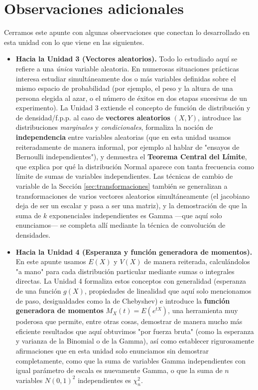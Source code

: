 \documentclass[11pt,a4paper]{article}
\theoremstyle{plain}
\theoremstyle{definition}
\theoremstyle{remark}
\begin{document}
\section{Observaciones adicionales}

Cerramos este apunte con algunas observaciones que conectan lo desarrollado en esta unidad con lo que viene en las siguientes.

\begin{itemize}
\item \textbf{Hacia la Unidad 3 (Vectores aleatorios).} Todo lo estudiado aquí se refiere a una \emph{única} variable aleatoria. En numerosas situaciones prácticas interesa estudiar simultáneamente dos o más variables definidas sobre el mismo espacio de probabilidad (por ejemplo, el peso y la altura de una persona elegida al azar, o el número de éxitos en dos etapas sucesivas de un experimento). La Unidad 3 extiende el concepto de función de distribución y de densidad/f.p.p. al caso de \textbf{vectores aleatorios} $(X,Y)$, introduce las distribuciones \emph{marginales} y \emph{condicionales}, formaliza la noción de \textbf{independencia} entre variables aleatorias (que en esta unidad usamos reiteradamente de manera informal, por ejemplo al hablar de "ensayos de Bernoulli independientes"), y demuestra el \textbf{Teorema Central del Límite}, que explica por qué la distribución Normal aparece con tanta frecuencia como límite de sumas de variables independientes. Las técnicas de cambio de variable de la Sección \ref{sec:transformaciones} también se generalizan a transformaciones de varios vectores aleatorios simultáneamente (el jacobiano deja de ser un escalar y pasa a ser una matriz), y la demostración de que la suma de $k$ exponenciales independientes es Gamma —que aquí solo enunciamos— se completa allí mediante la técnica de convolución de densidades.

\item \textbf{Hacia la Unidad 4 (Esperanza y función generadora de momentos).} En este apunte usamos $E(X)$ y $V(X)$ de manera reiterada, calculándolos "a mano" para cada distribución particular mediante sumas o integrales directas. La Unidad 4 formaliza estos conceptos con generalidad (esperanza de una función $g(X)$, propiedades de linealidad que aquí solo mencionamos de paso, desigualdades como la de Chebyshev) e introduce la \textbf{función generadora de momentos} $M_X(t)=E(e^{tX})$, una herramienta muy poderosa que permite, entre otras cosas, demostrar de manera mucho más eficiente resultados que aquí obtuvimos "por fuerza bruta" (como la esperanza y varianza de la Binomial o de la Gamma), así como establecer rigurosamente afirmaciones que en esta unidad solo enunciamos sin demostrar completamente, como que la suma de variables Gamma independientes con igual parámetro de escala es nuevamente Gamma, o que la suma de $n$ variables $N(0,1)^2$ independientes es $\chi^2_n$.


\end{itemize}
\end{document}
